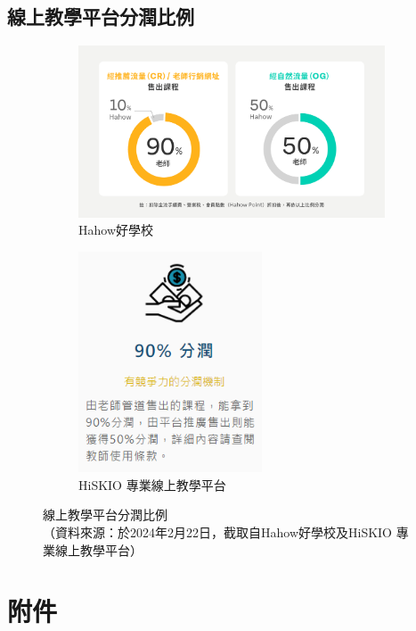 \subsection{線上教學平台分潤比例}
\label{fig:Appendix-profit-sharing}
\begin{figure}[H]
	\centering
	\begin{subfigure}{0.45\linewidth}
		\centering
		\includegraphics[width=1\textwidth]{images/hahow.png}
		\caption{Hahow好學校}
		\label{fig:Hahow}
	\end{subfigure}
	\begin{subfigure}{0.45\linewidth}
		\centering
		\includegraphics[width=0.6\textwidth]{images/hiskio.png}
		\caption{HiSKIO 專業線上教學平台}
		\label{fig:HiSKIO}
	\end{subfigure}
	\caption[線上教學平台分潤比例]{線上教學平台分潤比例\\（資料來源：於2024年2月22日，截取自Hahow好學校及HiSKIO 專業線上教學平台）}
\end{figure}

\newpage
\section{\centering 附件}
